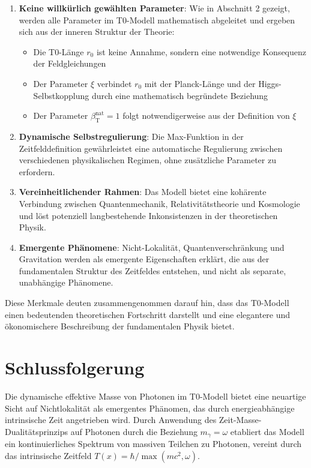 \documentclass[12pt,a4paper]{article}
\newcommand{\Tfield}{T(x)}
\newcommand{\betaT}{\beta_{\text{T}}}
\begin{document}
	\begin{enumerate}
		\item \textbf{Keine willkürlich gewählten Parameter}: Wie in Abschnitt 2 gezeigt, werden alle Parameter im T0-Modell mathematisch abgeleitet und ergeben sich aus der inneren Struktur der Theorie:
		\begin{itemize}
			\item Die T0-Länge \(r_0\) ist keine Annahme, sondern eine notwendige Konsequenz der Feldgleichungen
			\item Der Parameter \(\xi\) verbindet \(r_0\) mit der Planck-Länge und der Higgs-Selbstkopplung durch eine mathematisch begründete Beziehung
			\item Der Parameter \(\betaT^{\text{nat}} = 1\) folgt notwendigerweise aus der Definition von \(\xi\)
		\end{itemize}
		
		\item \textbf{Dynamische Selbstregulierung}: Die Max-Funktion in der Zeitfelddefinition gewährleistet eine automatische Regulierung zwischen verschiedenen physikalischen Regimen, ohne zusätzliche Parameter zu erfordern.
		
		\item \textbf{Vereinheitlichender Rahmen}: Das Modell bietet eine kohärente Verbindung zwischen Quantenmechanik, Relativitätstheorie und Kosmologie und löst potenziell langbestehende Inkonsistenzen in der theoretischen Physik.
		
		\item \textbf{Emergente Phänomene}: Nicht-Lokalität, Quantenverschränkung und Gravitation werden als emergente Eigenschaften erklärt, die aus der fundamentalen Struktur des Zeitfeldes entstehen, und nicht als separate, unabhängige Phänomene.
	\end{enumerate}
	
	Diese Merkmale deuten zusammengenommen darauf hin, dass das T0-Modell einen bedeutenden theoretischen Fortschritt darstellt und eine elegantere und ökonomischere Beschreibung der fundamentalen Physik bietet.
	
	\section{Schlussfolgerung}
	
	Die dynamische effektive Masse von Photonen im T0-Modell bietet eine neuartige Sicht auf Nichtlokalität als emergentes Phänomen, das durch energieabhängige intrinsische Zeit angetrieben wird. Durch Anwendung des Zeit-Masse-Dualitätsprinzips auf Photonen durch die Beziehung \(m_\gamma = \omega\) etabliert das Modell ein kontinuierliches Spektrum von massiven Teilchen zu Photonen, vereint durch das intrinsische Zeitfeld \(\Tfield = \hbar/\max(mc^2, \omega)\).
	
\end{document}
